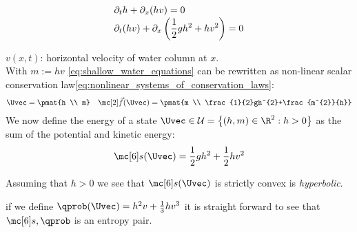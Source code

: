 \begin{examplebox}\nospacing
    \begin{example}
        \label{example:shallow_water_equations_entropy_pair}\leavevmode\\
        \begin{minipage}{0.55\textwidth}
            \begin{align}
              &\partial_{t}h+\partial_{x}(hv)=0\nonumber \\[-1\jot]
              &\partial_{t}(hv)+\partial_{x}\left(\frac{1}{2}gh^{2}+hv^{2}\right)=0\label{eq:shallow_water_equations_example2}
            \end{align}
        \end{minipage}\hfill
        \begin{minipage}[c]{0.38\textwidth}
            \begin{figure}[H]
                \centering{
                  \def\svgwidth{100pt}
                  \resizebox{\linewidth}{!}{}
                }
            \end{figure}
        \end{minipage}
        $v(x,t)$: horizontal velocity of water column at $x$.\\
        With $m:=hv$ \cref{eq:shallow_water_equations} can be rewritten as non-linear scalar conservation law\cref{eq:nonlinear_systems_of_conservation_laws}:
        \begin{align}
          \Uvec=\pmat{h \\ m}&&\fluxvec(\Uvec)=\pmat{m \\ \frac{1}{2}gh^{2}+\frac{m^{2}}{h}}
        \end{align}
        We now define the energy of a state $\Uvec\in\admissibleset=\left\{(h,m)\in\R^{2}:h>0\right\}$ as the sum of the potential and kinetic energy:
        \begin{align*}
          \entropy(\Uvec)=\frac{1}{2}gh^{2}+\frac{1}{2}hv^{2}
        \end{align*}
        \begin{itemizenosep}
        \item Assuming that $h>0$ we see that $\entropy(\Uvec)$ is strictly convex
        is \textit{hyperbolic}.
        \item if we define $\qprob(\Uvec)=h^{2}v+\frac{1}{3}hv^{3}$ it is straight forward to see that $\entropy,\qprob$ is an entropy pair.
        \end{itemizenosep}
    \end{example}
\end{examplebox}
